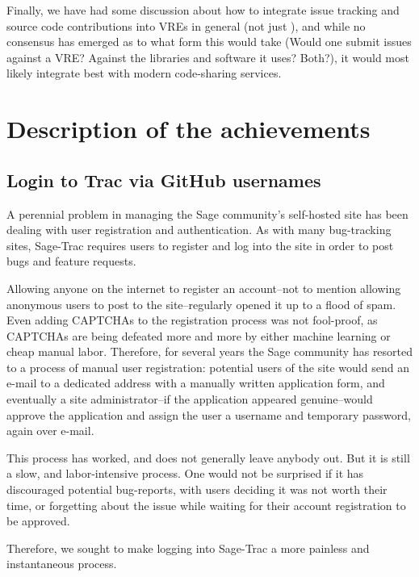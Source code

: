Finally, we have had some discussion about how to integrate issue tracking and
source code contributions into VREs in general (not just \cocalc), and while no
consensus has emerged as to what form this would take (Would one submit issues
against a VRE? Against the libraries and software it uses?  Both?), it would
most likely integrate best with modern code-sharing services.


\hypertarget{description-of-the-achievements}{%
\section{Description of the
achievements}\label{description-of-the-achievements}}

\hypertarget{trac-github-login}{%
\subsection{Login to Trac via GitHub usernames}\label{trac-github-login}}
A perennial problem in managing the Sage community's self-hosted \Trac site has
been dealing with user registration and authentication.  As with many
bug-tracking sites, Sage-Trac requires users to register and log into the site
in order to post bugs and feature requests.

Allowing anyone on the internet to register an account--not to mention allowing
anonymous users to post to the site--regularly opened it up to a flood of spam.
Even adding CAPTCHAs to the registration process was not fool-proof, as
CAPTCHAs are being defeated more and more by either machine learning or cheap
manual labor.  Therefore, for several years the Sage community has resorted
to a process of manual user registration: potential users of the site would
send an e-mail to a dedicated address with a manually written application form,
and eventually a site administrator--if the application appeared genuine--would
approve the application and assign the user a username and temporary password,
again over e-mail.

This process has worked, and does not generally leave anybody out.  But it is
still a slow, and labor-intensive process.  One would not be surprised if it
has discouraged potential bug-reports, with users deciding it was not worth
their time, or forgetting about the issue while waiting for their account
registration to be approved.

Therefore, we sought to make logging into Sage-Trac a more painless and
instantaneous process.

